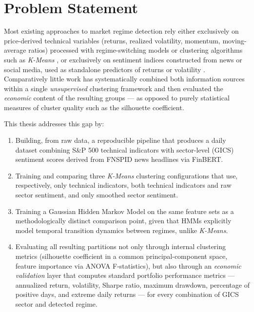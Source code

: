 \section{Problem Statement}
\label{sec:problem-statement}

Most existing approaches to market regime detection rely either
exclusively on price-derived technical variables (returns, realized
volatility, momentum, moving-average ratios) processed with
regime-switching models or clustering algorithms such as \textit{K-Means}
\cite{ang2002regime,guidolin2011}, or exclusively on sentiment indices
constructed from news or social media, used as standalone predictors of
returns or volatility \cite{tetlock2007,baker2006}. Comparatively little
work has systematically combined both information sources within a
single \emph{unsupervised} clustering framework and then evaluated the
\emph{economic} content of the resulting groups --- as opposed to purely
statistical measures of cluster quality such as the silhouette
coefficient.

This thesis addresses this gap by:

\begin{enumerate}
  \item Building, from raw data, a reproducible pipeline that produces a
  daily dataset combining S\&P 500 technical indicators with sector-level
  (GICS) sentiment scores derived from FNSPID news headlines via FinBERT.
  \item Training and comparing three \textit{K-Means} clustering
  configurations that use, respectively, only technical indicators, both
  technical indicators and raw sector sentiment, and only smoothed sector
  sentiment.
  \item Training a Gaussian Hidden Markov Model on the same feature sets
  as a methodologically distinct comparison point, given that HMMs
  explicitly model temporal transition dynamics between regimes, unlike
  \textit{K-Means}.
  \item Evaluating all resulting partitions not only through internal
  clustering metrics (silhouette coefficient in a common
  principal-component space, feature importance via ANOVA F-statistics),
  but also through an \emph{economic validation} layer that computes
  standard portfolio performance metrics --- annualized return,
  volatility, Sharpe ratio, maximum drawdown, percentage of positive days,
  and extreme daily returns --- for every combination of GICS sector and
  detected regime.
\end{enumerate}

